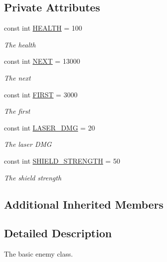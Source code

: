 \subsection*{Private Attributes}
\begin{DoxyCompactItemize}
\item 
const int \hyperlink{classXaria_1_1Enemies_1_1Basic_a2609842a1a385794273a9651de16b454}{H\+E\+A\+L\+TH} = 100
\begin{DoxyCompactList}\small\item\em The health \end{DoxyCompactList}\item 
const int \hyperlink{classXaria_1_1Enemies_1_1Basic_a377f16806bd88ac6fb4d8e5da6f31115}{N\+E\+XT} = 13000
\begin{DoxyCompactList}\small\item\em The next \end{DoxyCompactList}\item 
const int \hyperlink{classXaria_1_1Enemies_1_1Basic_aaf2e0ae06d49fceedf17fbe8b1549fc8}{F\+I\+R\+ST} = 3000
\begin{DoxyCompactList}\small\item\em The first \end{DoxyCompactList}\item 
const int \hyperlink{classXaria_1_1Enemies_1_1Basic_af24c36503192c77f398b99b7b58be5ce}{L\+A\+S\+E\+R\+\_\+\+D\+MG} = 20
\begin{DoxyCompactList}\small\item\em The laser D\+MG \end{DoxyCompactList}\item 
const int \hyperlink{classXaria_1_1Enemies_1_1Basic_a7b7d731586922c39e6c4ed9a7e380dbf}{S\+H\+I\+E\+L\+D\+\_\+\+S\+T\+R\+E\+N\+G\+TH} = 50
\begin{DoxyCompactList}\small\item\em The shield strength \end{DoxyCompactList}\end{DoxyCompactItemize}
\subsection*{Additional Inherited Members}


\subsection{Detailed Description}
The basic enemy class. 


